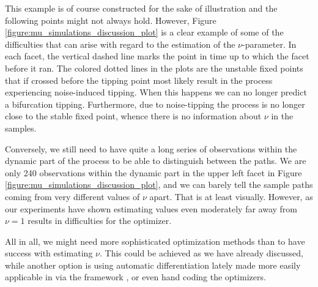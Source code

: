 This example is of course constructed for the sake of illustration and the following points might not always hold. However, Figure \ref{figure:mu_simulations_discussion_plot} is a clear example of some of the difficulties that can arise with regard to the estimation of the $\nu$-parameter. In each facet, the vertical dashed line marks the point in time up to which the facet before it ran. The colored dotted lines in the plots are the unstable fixed points that if crossed before the tipping point most likely result in the process experiencing noise-induced tipping. When this happens we can no longer predict a bifurcation tipping. Furthermore, due to noise-tipping the process is no longer close to the stable fixed point, whence there is no information about $\nu$ in the samples.

Conversely, we still need to have quite a long series of observations within the dynamic part of the process to be able to distinguish between the paths. We are only 240 observations within the dynamic part in the upper left facet in Figure \ref{figure:mu_simulations_discussion_plot}, and we can barely tell the sample paths coming from very different values of $\nu$ apart. That is at least visually. However, as our experiments have shown estimating values even moderately far away from $\nu = 1$ results in difficulties for the optimizer. 

All in all, we might need more sophisticated optimization methods than  to have success with estimating $\nu$. This could be achieved as we have already discussed, while another option is using automatic differentiation lately made more easily applicable in  via the  framework \cite{torch}, or even hand coding the optimizers.

